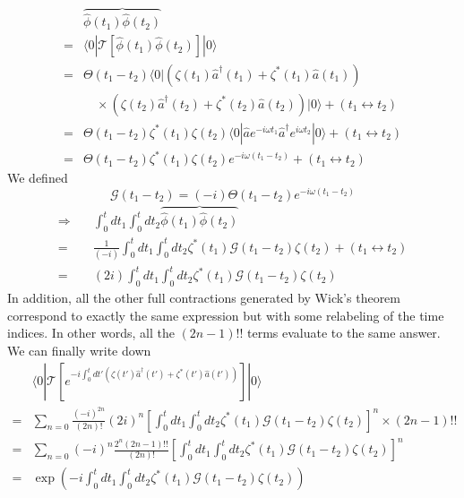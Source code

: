 \begin{align*}
    &\overbrace{\hat{\phi}\left( t_1 \right) \hat{\phi}\left( t_2 \right) }\\
    =&\langle 0|\mathcal{T} \left[ \hat{\phi}\left( t_1 \right) \hat{\phi}\left( t_2 \right) \right] |0\rangle \\
    =&\Theta \left( t_1-t_2 \right) \langle 0|\left( \zeta \left( t_1 \right) \hat{a}^{\dagger}\left( t_1 \right) +\zeta ^*\left( t_1 \right) \hat{a}\left( t_1 \right) \right)\\
    &\quad \times \left( \zeta \left( t_2 \right) \hat{a}^{\dagger}\left( t_2 \right) +\zeta ^*\left( t_2 \right) \hat{a}\left( t_2 \right) \right) |0\rangle +\left( t_1\leftrightarrow t_2 \right) \\
    =&\Theta \left( t_1-t_2 \right) \zeta ^*\left( t_1 \right) \zeta \left( t_2 \right) \langle 0|\hat{a}e^{-i\omega t_1}\hat{a}^{\dagger}e^{i\omega t_2}|0\rangle +\left( t_1\leftrightarrow t_2 \right) \\
    =&\Theta \left( t_1-t_2 \right) \zeta ^*\left( t_1 \right) \zeta \left( t_2 \right) e^{-i\omega \left( t_1-t_2 \right)}+\left( t_1\leftrightarrow t_2 \right)
\end{align*}
We defined
\[ \mathscr{G} \left( t_1-t_2 \right) =\left( -i \right) \Theta \left( t_1-t_2 \right) e^{-i\omega \left( t_1-t_2 \right)}\]
\begin{align*}
    \Rightarrow \quad &\int_0^t{dt_1\int_0^t{dt_2\overbrace{\hat{\phi}\left( t_1 \right) \hat{\phi}\left( t_2 \right) }}}\\
    =&\frac{1}{\left( -i \right)}\int_0^t{dt_1\int_0^t{dt_2\zeta ^*\left( t_1 \right) \mathscr{G} \left( t_1-t_2 \right) \zeta \left( t_2 \right)}}+\left( t_1\leftrightarrow t_2 \right) \\
    =&\left( 2i \right) \int_0^t{dt_1\int_0^t{dt_2\zeta ^*\left( t_1 \right) \mathscr{G} \left( t_1-t_2 \right) \zeta \left( t_2 \right)}}
\end{align*}
In addition, all the other full contractions generated by Wick's theorem correspond to exactly the same expression but with some relabeling of the time indices. In other words, all the $(2n-1)!!$ terms evaluate to the same answer. We can finally write down
\begin{align*}
    &\langle 0|\mathcal{T} \left[ e^{-i\int_0^t{dt'\left( \zeta \left( t' \right) \hat{a}^{\dagger}\left( t' \right) +\zeta ^*\left( t' \right) \hat{a}\left( t' \right) \right)}} \right] |0\rangle \\
    =&\sum_{n=0}{\frac{\left( -i \right) ^{2n}}{\left( 2n \right) !}\left( 2i \right) ^n\left[ \int_0^t{dt_1\int_0^t{dt_2\zeta ^*\left( t_1 \right) \mathscr{G} \left( t_1-t_2 \right) \zeta \left( t_2 \right)}} \right] ^n\times \left( 2n-1 \right) !!}\\
    =&\sum_{n=0}{\left( -i \right) ^n\frac{2^n\left( 2n-1 \right) !!}{\left( 2n \right) !}\left[ \int_0^t{dt_1\int_0^t{dt_2\zeta ^*\left( t_1 \right) \mathscr{G} \left( t_1-t_2 \right) \zeta \left( t_2 \right)}} \right] ^n}\\
    =&\exp \left( -i\int_0^t{dt_1\int_0^t{dt_2\zeta ^*\left( t_1 \right) \mathscr{G} \left( t_1-t_2 \right) \zeta \left( t_2 \right)}} \right)
\end{align*}
